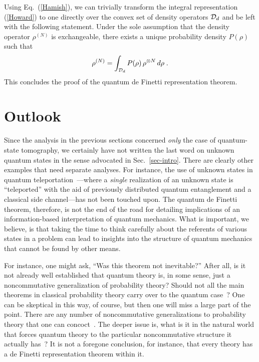 Using Eq.~(\ref{Hamish}), we can trivially transform the integral
representation (\ref{Howard}) to one directly over the convex set
of density operators ${\cal D}_d$ and be left with the following
statement. Under the sole assumption that the density operator
$\rho^{(N)}$ is exchangeable, there exists a unique probability
density $P(\rho)$ such that
\begin{equation}
\rho^{(N)}=\int_{{\cal D}_d} P(\rho)\, \rho^{\otimes N}\, d\rho\;.
\end{equation}
This concludes the proof of the quantum de Finetti representation
theorem.

\section{Outlook} \label{sec-outlook}

Since the analysis in the previous sections concerned {\it only\/}
the case of quantum-state tomography, we certainly have not
written the last word on unknown quantum states in the sense
advocated in Sec.~\ref{sec-intro}. There are clearly other
examples that need separate analyses. For instance, the use of
unknown states in quantum teleportation~\cite{Bennett1993}---where
a {\it single\/} realization of an unknown state is ``teleported''
with the aid of previously distributed quantum entanglement and a
classical side channel---has not been touched upon. The quantum de
Finetti theorem, therefore, is not the end of the road for
detailing implications of an information-based interpretation of
quantum mechanics. What is important, we believe, is that taking
the time to think carefully about the referents of various states
in a problem can lead to insights into the structure of quantum
mechanics that cannot be found by other means.

For instance, one might ask, ``Was this theorem not inevitable?''
After all, is it not already well established that quantum theory
is, in some sense, just a noncommutative generalization of
probability theory?  Should not all the main theorems in classical
probability theory carry over to the quantum
case~\cite{CommentAccardi}?  One can be skeptical in this way, of
course, but then one will miss a large part of the point.  There
are any number of noncommutative generalizations to probability
theory that one can concoct~\cite{Hiai2000}.  The deeper issue is,
what is it in the natural world that forces quantum theory to the
particular noncommutative structure it actually
has~\cite{Wheeler2000}? It is not a foregone conclusion, for
instance, that every theory has a de Finetti representation
theorem within it.


